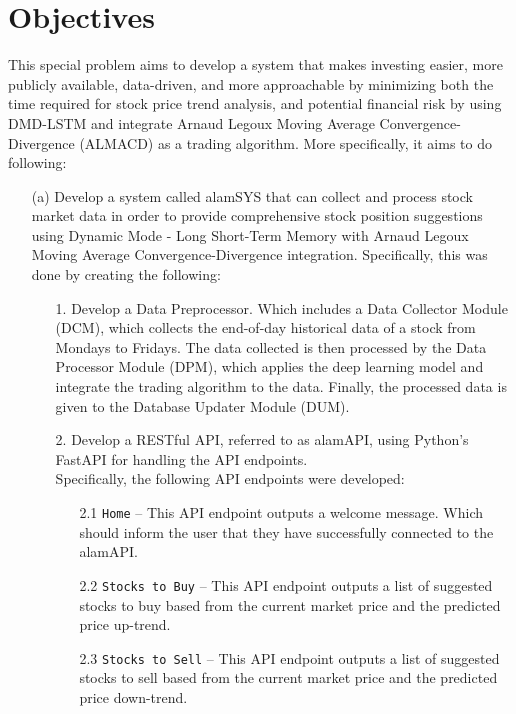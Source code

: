 \section{Objectives}
\label{sec:objectives}
This special problem aims to develop a system that makes investing easier, 
more publicly available, data-driven, and more approachable by minimizing both the 
time required for stock price trend analysis, and potential financial risk 
by using DMD-LSTM and integrate Arnaud Legoux Moving Average Convergence-Divergence (ALMACD)
as a trading algorithm. More specifically, it aims to do following:
\begin{itemize}
  \item[(a)] Develop a system called alamSYS that can collect and process stock market data in order 
  to provide comprehensive stock position suggestions using Dynamic Mode - Long Short-Term Memory with 
  Arnaud Legoux Moving Average Convergence-Divergence integration. Specifically, this was done
  by creating the following:
    \begin{itemize}
      \item[1.] Develop a Data Preprocessor. Which includes a Data Collector Module (DCM), 
      which collects the end-of-day historical data of a stock from Mondays to Fridays. 
      The data collected is then processed by the Data Processor Module (DPM), which applies the
      deep learning model and integrate the trading algorithm to the data. Finally, the
      processed data is given to the Database Updater Module (DUM).
      \item[2.] Develop a RESTful API, referred to as alamAPI, 
      using Python's FastAPI for handling the API endpoints.
      \hfill \\
        Specifically, the following API endpoints were developed:
        \begin{itemize}
            \item[2.1] \texttt{Home} – This API endpoint outputs a welcome message. 
            Which should inform the user that they have successfully connected to the alamAPI.
            \item [2.2]	\texttt{Stocks to Buy} – This API endpoint outputs a list of suggested 
            stocks to buy based from the current market price and the predicted price up-trend.
            \item [2.3] \texttt{Stocks to Sell} – This API endpoint outputs a list of suggested
            stocks to sell based from the current market price and the predicted price down-trend.

\end{itemize}
\end{itemize}
\end{itemize}
